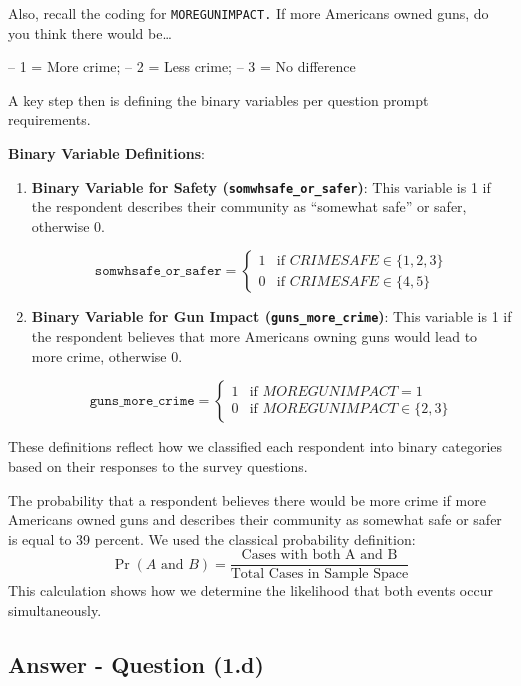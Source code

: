 \documentclass[
  11pt,
]{article}
\begin{document}
Also, recall the coding for \texttt{MOREGUNIMPACT.} If more Americans
owned guns, do you think there would be\ldots{}

-- 1 = More crime; -- 2 = Less crime; -- 3 = No difference

A key step then is defining the binary variables per question prompt
requirements.

\textbf{Binary Variable Definitions}:

\begin{enumerate}
\def\labelenumi{\arabic{enumi}.}
\item
  \textbf{Binary Variable for Safety (\texttt{somwhsafe\_or\_safer})}:
  This variable is 1 if the respondent describes their community as
  ``somewhat safe'' or safer, otherwise 0.

  \[ 
  \texttt{somwhsafe\_or\_safer} = 
  \begin{cases} 
     1 & \text{if } CRIMESAFE \in \{1, 2, 3\} \\
     0 & \text{if } CRIMESAFE \in \{4, 5\}
  \end{cases}
  \]
\item
  \textbf{Binary Variable for Gun Impact (\texttt{guns\_more\_crime})}:
  This variable is 1 if the respondent believes that more Americans
  owning guns would lead to more crime, otherwise 0.

  \[ 
  \texttt{guns\_more\_crime} = 
  \begin{cases} 
     1 & \text{if } MOREGUNIMPACT = 1 \\
     0 & \text{if } MOREGUNIMPACT \in \{2, 3\}
  \end{cases}
  \]
\end{enumerate}

These definitions reflect how we classified each respondent into binary
categories based on their responses to the survey questions.

The probability that a respondent believes there would be more crime if
more Americans owned guns and describes their community as somewhat safe
or safer is equal to 39 percent. We used the classical probability
definition:
\[\Pr(A\text{ and }B) = \frac{\text{Cases with both A and B}}{\text{Total Cases in Sample Space}}\]
This calculation shows how we determine the likelihood that both events
occur simultaneously.

\subsection{Answer - Question (1.d)}\label{answer---question-1.d}
\end{document}
